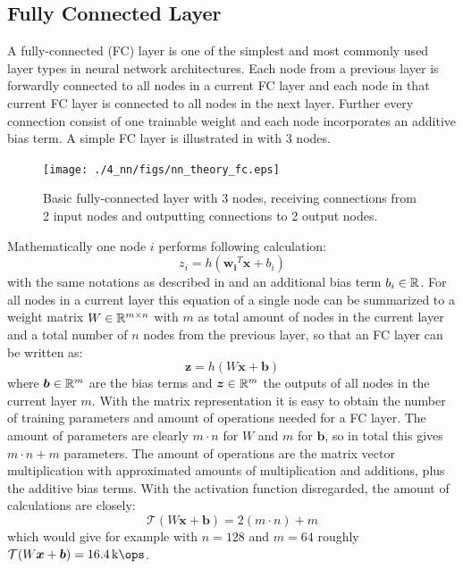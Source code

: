
\subsection{Fully Connected Layer}
A fully-connected (FC) layer is one of the simplest and most commonly used layer types in neural network architectures.
Each node from a previous layer is forwardly connected to all nodes in a current FC layer and each node in that current FC layer is connected to all nodes in the next layer.
Further every connection consist of one trainable weight and each node incorporates an additive bias term.
A simple FC layer is illustrated in  with 3 nodes.
\begin{figure}[!ht]
  \centering
    \texttt{[image: ./4\_nn/figs/nn\_theory\_fc.eps]}
  \caption{Basic fully-connected layer with 3 nodes, receiving connections from 2 input nodes and outputting connections to 2 output nodes.}
  \label{fig:nn_theory_fc}
\end{figure}
\FloatBarrier
\noindent
Mathematically one node $i$ performs following calculation:
\begin{equation}
  z_i = h(\bm{w_i}^T \bm{x} + b_i)
\end{equation}
with the same notations as described in  and an additional bias term $b_i \in \mathbb{R}$.
For all nodes in a current layer this equation of a single node can be summarized to a weight matrix $W \in \mathbb{R}^{m \times n}$ with $m$ as total amount of nodes in the current layer and a total number of $n$ nodes from the previous layer, so that an FC layer can be written as:
\begin{equation}
  \bm{z} = h(W \bm{x} + \bm{b})
\end{equation}
where $\bm{b} \in \mathbb{R}^m$ are the bias terms and $\bm{z} \in \mathbb{R}^m$ the outputs of all nodes in the current layer $m$.
With the matrix representation it is easy to obtain the number of training parameters and amount of operations needed for a FC layer.
The amount of parameters are clearly $m \cdot n$ for $W$ and $m$ for $\bm{b}$, so in total this gives $m \cdot n + m$ parameters.
The amount of operations are the matrix vector multiplication with approximated amounts of multiplication and additions, plus the additive bias terms.
With the activation function disregarded, the amount of calculations are closely:
\begin{equation} 
  \mathcal{T}(W \bm{x} + \bm{b}) = 2 (m \cdot n) + m
\end{equation}
which would give for example with $n = 128$ and $m = 64$ roughly $\mathcal{T}(W \bm{x} + \bm{b}) = \SI{16.4}{\kilo\ops}$.


